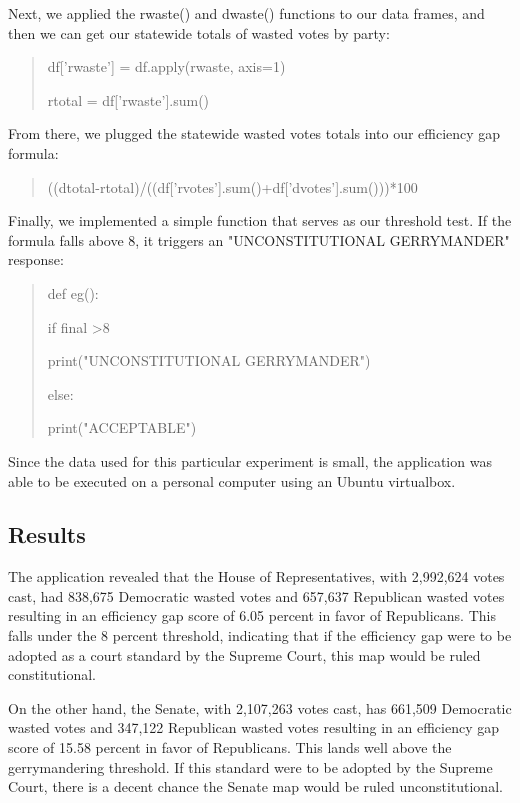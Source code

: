 \documentclass[sigconf]{acmart}
\begin{document}
Next, we applied the rwaste() and dwaste() functions to our data frames, and then we can get our statewide totals of wasted votes by party:

\begin{quote}
    df['rwaste'] = df.apply(rwaste, axis=1)
    
    rtotal = df['rwaste'].sum()
\end{quote}

From there, we plugged the statewide wasted votes totals into our efficiency gap formula:

\begin{quote}
((dtotal-rtotal)/((df['rvotes'].sum()+df['dvotes'].sum()))*100
\end{quote}

Finally, we implemented a simple function that serves as our threshold test. If the formula falls above 8, it triggers an "UNCONSTITUTIONAL GERRYMANDER" response:

\begin{quote}
    def eg():
    
        if final \textgreater 8
        
          print("UNCONSTITUTIONAL GERRYMANDER")
            
        else:
        
          print("ACCEPTABLE")
\end{quote}

Since the data used for this particular experiment is small, the application was able to be executed on a personal computer using an Ubuntu virtualbox. 

\subsection{Results}

The application revealed that the House of Representatives, with 2,992,624 votes cast, had 838,675 Democratic wasted votes and 657,637 Republican wasted votes resulting in an efficiency gap score of 6.05 percent in favor of Republicans. This falls under the 8 percent threshold, indicating that if the efficiency gap were to be adopted as a court standard by the Supreme Court, this map would be ruled constitutional.

On the other hand, the Senate, with 2,107,263 votes cast, has 661,509 Democratic wasted votes and 347,122 Republican wasted votes resulting in an efficiency gap score of 15.58 percent in favor of Republicans. This lands well above the gerrymandering threshold. If this standard were to be adopted by the Supreme Court, there is a decent chance the Senate map would be ruled unconstitutional. 
\end{document}
